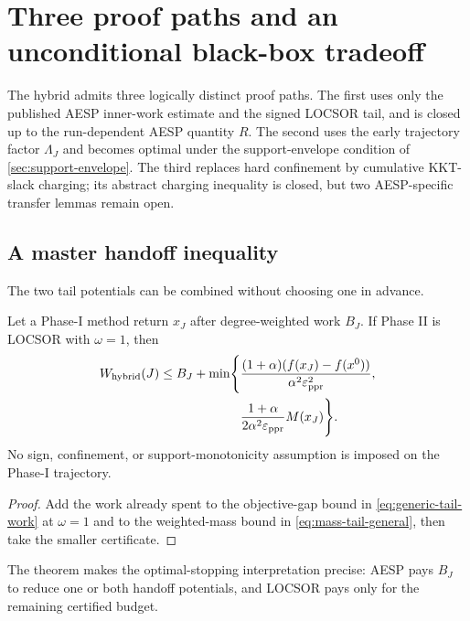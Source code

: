 \section{Three proof paths and an unconditional black-box tradeoff}
\label{sec:three-paths}

The hybrid admits three logically distinct proof paths.  The first uses only
the published AESP inner-work estimate and the signed LOCSOR tail, and is
closed up to the run-dependent AESP quantity $R$.  The second uses the early
trajectory factor $\Lambda_J$ and becomes optimal under the support-envelope
condition of \cref{sec:support-envelope}.  The third replaces hard confinement
by cumulative KKT-slack charging; its abstract charging inequality is closed,
but two AESP-specific transfer lemmas remain open.

\subsection{A master handoff inequality}

The two tail potentials can be combined without choosing one in advance.

\begin{theorem}
\label{thm:master-handoff}
Let a Phase-I method return $x_J$ after degree-weighted work $B_J$.  If Phase
II is LOCSOR with $\omega=1$, then
\begin{equation}
\begin{split}
  W_{\rm hybrid}(J)
  \leq B_J+\min\Biggl\{
    &\frac{(1+\alpha)(f(x_J)-f(x^0))}
          {\alpha^2\varepsilon_{\mathrm{ppr}}^2},\\
    &\frac{1+\alpha}{2\alpha^2\varepsilon_{\mathrm{ppr}}}M(x_J)
  \Biggr\}.
  \label{eq:master-handoff}
\end{split}
\end{equation}
No sign, confinement, or support-monotonicity assumption is imposed on the
Phase-I trajectory.
\end{theorem}

\begin{proof}
Add the work already spent to the objective-gap bound in
\cref{eq:generic-tail-work} at $\omega=1$ and to the weighted-mass bound in
\cref{eq:mass-tail-general}, then take the smaller certificate.
\end{proof}

The theorem makes the optimal-stopping interpretation precise: AESP pays
$B_J$ to reduce one or both handoff potentials, and LOCSOR pays only for the
remaining certified budget.

